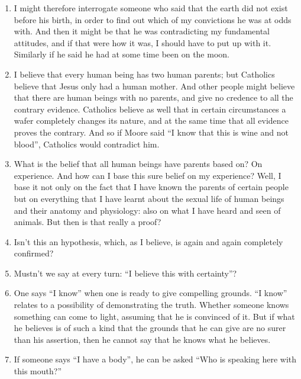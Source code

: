 \documentclass{book}
\begin{document}
\begin{enumerate}
\item
I might therefore interrogate someone who said that the earth did not exist
before his birth, in order to find out which of my convictions he was at odds
with. And then it might be that he was contradicting my fundamental attitudes,
and if that were how it was, I should have to put up with it.  Similarly if he
said he had at some time been on the moon.

\item
I believe that every human being has two human parents; but Catholics believe
that Jesus only had a human mother. And other people might believe that there
are human beings with no parents, and give no credence to all the contrary
evidence. Catholics believe as well that in certain circumstances a wafer
completely changes its nature, and at the same time that all evidence proves
the contrary. And so if Moore said ``I know that this is wine and not blood'',
Catholics would contradict him.

\item
What is the belief that all human beings have parents based on? On experience.
And how can I base this sure belief on my experience? Well, I base it not only
on the fact that I have known the parents of certain people but on everything
that I have learnt about the sexual life of human beings and their anatomy and
physiology: also on what I have heard and seen of animals. But then is that
really a proof?

\item
Isn't this an hypothesis, which, as I believe, is again and again completely
confirmed?

\item
Mustn't we say at every turn: ``I believe this with certainty''?

\item
One says ``I know'' when one is ready to give compelling grounds. ``I know''
relates to a possibility of demonstrating the truth. Whether someone knows
something can come to light, assuming that he is convinced of it.  But if what
he believes is of such a kind that the grounds that he can give are no surer
than his assertion, then he cannot say that he knows what he believes.

\item
If someone says ``I have a body'', he can be asked ``Who is speaking here with
this mouth?''


\end{enumerate}
\end{document}
